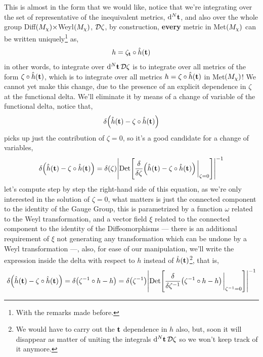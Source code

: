 This is almost in the form that we would like, notice that we're integrating over the set of representative of the inequivalent metrics, $\dd[N]{\vb t}$, and also over the whole group Diff$\qty(M_\chi)\times$Weyl$\qty(M_\chi)$, $\mathcal D \zeta$, 
by construction, \textbf{every} metric in Met$\qty(M_\chi)$ can be written uniquely\footnote{With the remarks made before.} as,
\begin{align*}
    h=\zeta_{\vb t}\circ \hat h\qty(\vb t)
\end{align*}
in other words, to integrate over $\dd[N]{\vb t}\mathcal D \zeta$ is to integrate over all metrics of the form $\zeta\circ \hat h\qty(\vb t)$, which is to integrate over 
all metrics $h=\zeta\circ \hat h\qty(\vb t)$ in Met$\qty(M_\chi)$! We cannot yet make this change, due to the presence of an explicit dependence in $\zeta$ at the functional delta. 
We'll eliminate it by means of a change of variable of the functional delta, notice that,
\begin{align*}
    \delta\qty(\hat h\qty(\vb t)-\zeta\circ \hat h\qty(\vb t))
\end{align*}
picks up just the contribution of $\zeta=0$, so it's a good candidate for a change of variables,
\begin{align*}
    \delta\qty(\hat h\qty(\vb t)-\zeta\circ \hat h\qty(\vb t))=\delta\qty(\zeta)\abs{\Det\qty[\fdv{}{\zeta}\qty(\hat h\qty(\vb t)-\zeta\circ\hat h\qty(\vb t))\eval_{\zeta=0}]}^{-1}
\end{align*}
let's compute step by step the right-hand side of this equation, as we're only interested in the solution of $\zeta=0$, what matters is just the connected component to the identity 
of the Gauge Group, this is parametrized by a function $\omega$ related to the Weyl transformation, and a vector field $\xi$ related to the connected component to the identity of the Diffeomorphisms --- 
there is an additional requirement of $\xi$ not generating any transformation which can be undone by a Weyl transformation ---, also, for ease of our manipulation, we'll write the expression inside the 
delta with respect to $h$ instead of $\hat h\qty(\vb t)$\footnote{We would have to carry out the $\vb t$ dependence in $h$ also, but, soon it will 
disappear as matter of uniting the integrals $\dd[N]{\vb t}\mathcal D \zeta$ so we won't keep track of it anymore.}, that is,
\begin{align*}
    \delta\qty(\hat h\qty(\vb t)-\zeta\circ \hat h\qty(\vb t))=\delta\qty( \zeta^{-1}\circ h-h)=\delta\qty(\zeta^{-1})\abs{\Det\qty[\fdv{}{\zeta^{-1}}\qty(\zeta^{-1}\circ h-h)\eval_{\zeta^{-1}=0}]}^{-1}
\end{align*}
